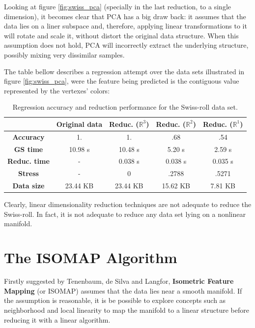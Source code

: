 \documentclass[12pt]{report}
\begin{document}
Looking at figure \ref{fig:swiss_pca} (specially in the last reduction, to a single dimension), it becomes clear that PCA has a big draw back: it assumes that the data lies on a liner subspace \cite{cay2005} and, therefore, applying linear transformations to it will rotate and scale it, without distort the original data structure. When this assumption does not hold, PCA will incorrectly extract the underlying structure, possibly mixing very dissimilar samples.

The table bellow describes a regression attempt over the data sets illustrated in figure \ref{fig:swiss_pca}, were the feature being predicted is the contiguous value represented by the vertexes' colors:

\begin{table}[H]
	\centering
	\begin{tabular}{|c|c|c|c|c|}
		\hline
		& \textbf{Original data} & \textbf{Reduc. ($\mathbb{R}^3$)} & \textbf{Reduc. ($\mathbb{R}^2$)} & \textbf{Reduc. ($\mathbb{R}^1$)} \\\hline
		\textbf{Accuracy} & 1. & 1. & .68 & .54 \\\hline
		\textbf{GS time}  & 10.98 s & 10.48 s & 5.20 s & 2.59 s \\\hline
		\textbf{Reduc. time} & - & 0.038 s & 0.038 s & 0.035 s \\\hline
		\textbf{Stress} & - & 0 & .2788 & .5271 \\\hline
		\textbf{Data size} & 23.44 KB & 23.44 KB & 15.62 KB  & 7.81 KB \\\hline
	\end{tabular}

	\captionsetup{justification=centering}
	\caption{Regression accuracy and reduction performance for the Swiss-roll data set.}
\end{table}

Clearly, linear dimensionality reduction techniques are not adequate to reduce the Swiss-roll. In fact, it is not adequate to reduce any data set lying on a nonlinear manifold.

\section{The ISOMAP Algorithm}

Firstly suggested by Tenenbaum, de Silva and Langfor, \textbf{Isometric Feature Mapping} (or ISOMAP) assumes that the data lies near a smooth manifold. If the assumption is reasonable, it is be possible to explore concepts such as neighborhood and local linearity to map the manifold to a linear structure before reducing it with a linear algorithm.
\end{document}
